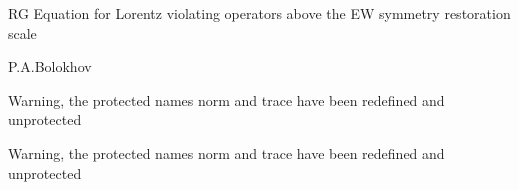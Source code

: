 \documentclass{article}
\begin{document}
\pagestyle{empty}
\begin{maplegroup}
\begin{Title}
RG Equation for Lorentz
violating operators above
the EW symmetry 
restoration scale
\end{Title}

\begin{Author}
P.A.Bolokhov
\end{Author}

\begin{Title}
\begin{mapleinput}
\end{mapleinput}
\end{Title}

\end{maplegroup}
\begin{maplegroup}
\begin{mapleinput}
Warning, the protected names norm and trace have been redefined and
unprotected
\end{mapleinput}

\mapleresult
\begin{maplettyout}
Warning, the protected names norm and trace have been redefined and
unprotected
\end{maplettyout}

\end{maplegroup}
\begin{maplegroup}
\begin{mapleinput}
\end{mapleinput}

\mapleresult
\begin{maplelatex}
\end{maplelatex}

\begin{maplelatex}
\end{maplelatex}

\begin{maplelatex}
\end{maplelatex}

\end{maplegroup}
\end{document}
